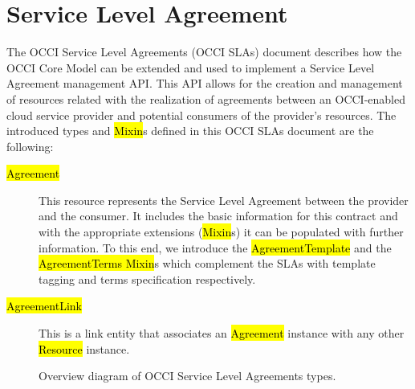 \documentclass[10pt,a4paper]{article}
\begin{document}

\section{Service Level Agreement}

The OCCI Service Level Agreements (OCCI SLAs) document describes how the OCCI Core Model \cite{occi:core} can be extended and used to implement a Service Level Agreement management API. This API allows for the creation and management of resources related with the realization of agreements between an OCCI-enabled cloud service provider and potential consumers of the provider’s resources. The introduced types and \hl{Mixin}s defined in this OCCI SLAs document are the following:


\begin{description}
\item[\hl{Agreement }] This resource represents the Service Level Agreement between the provider and the consumer. It includes the basic information for this contract and with the appropriate extensions (\hl{Mixin}s) it can be populated with further information. To this end, we introduce the \hl{AgreementTemplate} and the \hl{AgreementTerms Mixin}s which complement the SLAs with template tagging and terms specification respectively. 

\item[\hl{AgreementLink }] This is a link entity that associates an \hl{Agreement} instance with any other \hl{Resource} instance. 
\end{description}


\begin{figure}[!h]
	{\centering {} \par}
	\caption{Overview diagram of OCCI Service Level Agreements types.}
	\label{fig:sla_uml}
\end{figure}
\end{document}
